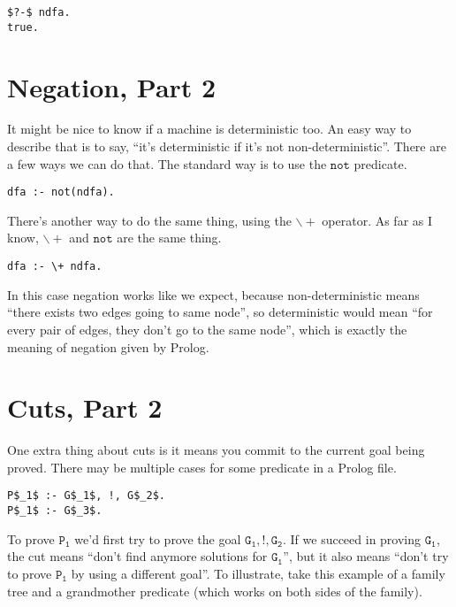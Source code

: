 \documentclass[a4paper,12pt]{article}
\newcommand{\kwa}[1]{\mathtt{#1}}
\begin{document}
\begin{lstlisting}
$?-$ ndfa.
true.
\end{lstlisting}

\section{Negation, Part 2}

It might be nice to know if a machine is deterministic too. An easy way to describe that is to say, ``it's deterministic if it's not non-deterministic''. There are a few ways we can do that. The standard way is to use the $\kwa{not}$ predicate.

\begin{lstlisting}
dfa :- not(ndfa).
\end{lstlisting}

\noindent
There's another way to do the same thing, using the $\kwa{ \backslash +}$ operator. As far as I know, $\kwa{ \backslash +}$ and $\kwa{not}$ are the same thing.

\begin{lstlisting}
dfa :- \+ ndfa.
\end{lstlisting}

\noindent
In this case negation works like we expect, because non-deterministic means ``there exists two edges going to same node'', so deterministic would mean ``for every pair of edges, they don't go to the same node'', which is exactly the meaning of negation given by Prolog. \\

\section{Cuts, Part 2}

One extra thing about cuts is it means you commit to the current goal being proved. There may be multiple cases for some predicate in a Prolog file.

\begin{lstlisting}
P$_1$ :- G$_1$, !, G$_2$.
P$_1$ :- G$_3$.
\end{lstlisting}

\noindent
To prove $\kwa{P_1}$ we'd first try to prove the goal $\kwa{G_1, !, G_2}$. If we succeed in proving $\kwa{G_1}$, the cut means ``don't find anymore solutions for $\kwa{G_1}$'', but it also means ``don't try to prove $\kwa{P_1}$ by using a different goal''. To illustrate, take this example of a family tree and a grandmother predicate (which works on both sides of the family).
\end{document}
